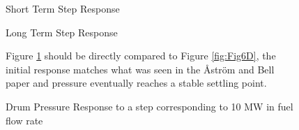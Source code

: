         
        \begin{figure}[ht]
            \begin{center}
                
                Short Term Step Response
                
                
                Long Term Step Response
                
                \caption{Drum Pressure Response to a step corresponding to 10 MW in fuel flow rate}
                \label{fig:Valve_Open1B}
            \end{center}
            Figure \ref{fig:Valve_Open1B} should be directly compared to Figure \ref{fig:Fig6D}, the initial response matches what was seen in the \r{A}str\"{o}m and Bell paper and pressure eventually reaches a stable settling point.
        \end{figure}  %
        
